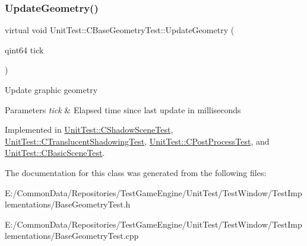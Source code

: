 \subsubsection{\texorpdfstring{UpdateGeometry()}{UpdateGeometry()}}
{\footnotesize\ttfamily virtual void Unit\+Test\+::\+C\+Base\+Geometry\+Test\+::\+Update\+Geometry (\begin{DoxyParamCaption}\item[{qint64}]{tick }\end{DoxyParamCaption})\hspace{0.3cm}{\ttfamily [pure virtual]}}

Update graphic geometry 
\begin{DoxyParams}{Parameters}
{\em tick} & Elapsed time since last update in milliseconds \\
\hline
\end{DoxyParams}


Implemented in \mbox{\hyperlink{class_unit_test_1_1_c_shadow_scene_test_a5586404efaf70bc59cefd4616fe7f761}{Unit\+Test\+::\+C\+Shadow\+Scene\+Test}}, \mbox{\hyperlink{class_unit_test_1_1_c_translucent_shadowing_test_a6d0809018d48d6f3f9e80147b894da5d}{Unit\+Test\+::\+C\+Translucent\+Shadowing\+Test}}, \mbox{\hyperlink{class_unit_test_1_1_c_post_process_test_aa1da5079813a860b1cc8a3554bce6f04}{Unit\+Test\+::\+C\+Post\+Process\+Test}}, and \mbox{\hyperlink{class_unit_test_1_1_c_basic_scene_test_a670726a40875ee0981cca18a3ea7ad0b}{Unit\+Test\+::\+C\+Basic\+Scene\+Test}}.



The documentation for this class was generated from the following files\+:\begin{DoxyCompactItemize}
\item 
E\+:/\+Common\+Data/\+Repositories/\+Test\+Game\+Engine/\+Unit\+Test/\+Test\+Window/\+Test\+Implementations/Base\+Geometry\+Test.\+h\item 
E\+:/\+Common\+Data/\+Repositories/\+Test\+Game\+Engine/\+Unit\+Test/\+Test\+Window/\+Test\+Implementations/Base\+Geometry\+Test.\+cpp\end{DoxyCompactItemize}
